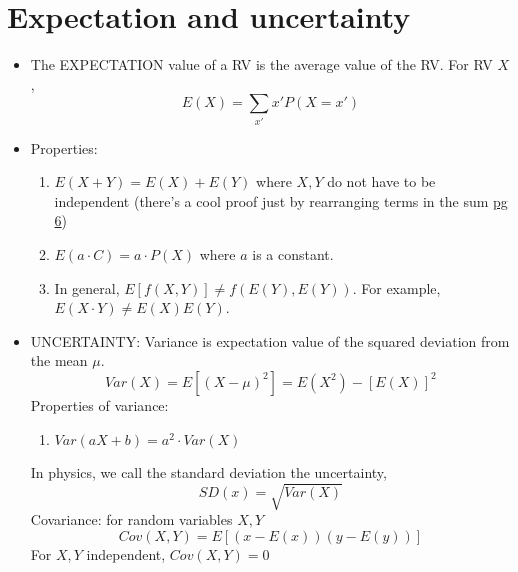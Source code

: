 \documentclass[12pt]{article}
\numberwithin{equation}{section}
\begin{document}
\section{Expectation and uncertainty}
\begin{itemize}
	\item The EXPECTATION value of a RV is the average value of the RV. For RV $ X $,
	\begin{equation}
			E(X) = \sum_{x'} x' P(X=x')
	\end{equation}
	\item Properties:
	\begin{enumerate}
		\item $ E(X+Y)  = E(X) + E(Y)$ where $ X,Y $ do not have to be independent (there's a cool proof just by rearranging terms in the sum \href{https://www.ocf.berkeley.edu/~yizhu/static/notes/stat_134_review.pdf}{pg 6}) 
		\item $ E(a\cdot C)  = a\cdot P(X)$ where $ a $ is a constant.
		\item In general, $ E[f(X,Y)] \neq f(E(Y), E(Y))$. For example, $ E(X\cdot Y)\neq E(X)E(Y) $.
	\end{enumerate}
	\item UNCERTAINTY: Variance is expectation value of the squared deviation from the mean $ \mu $.
	\begin{equation}
			Var(X) = E[(X-\mu)^2] = E(X^2) - [E(X)]^2
	\end{equation}
	Properties of variance:
	\begin{enumerate}
		\item $ Var(a X + b) =a^2\cdot Var(X)$ 
	\end{enumerate}
	In physics, we call the standard deviation the uncertainty,
	\begin{equation}
			SD(x) = \sqrt{Var(X)}
	\end{equation}
	Covariance: for random variables $ X,Y $
	\begin{equation}
			Cov(X,Y) = E[(x-E(x))(y-E(y))]
	\end{equation}
	For $ X,Y $ independent, $ Cov(X,Y)=0 $
\end{itemize}
\end{document}
